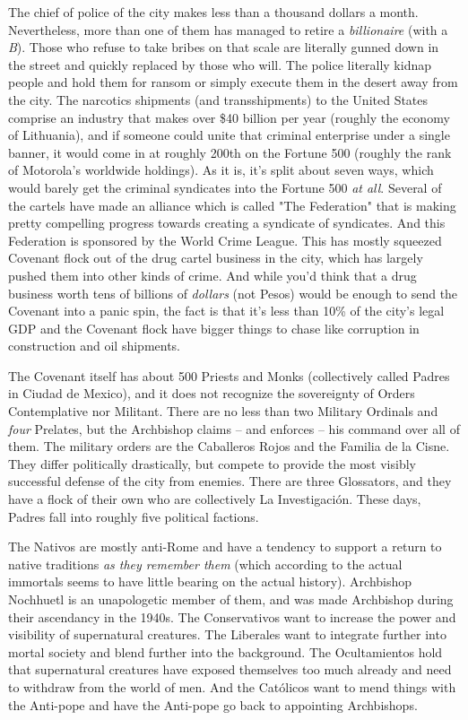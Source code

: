 \hspace{\parindent} The chief of police of the city makes less than a thousand dollars a month. Nevertheless, more than one of them has managed to retire a \textit{billionaire} (with a \textit{B}). Those who refuse to take bribes on that scale are literally gunned down in the street and quickly replaced by those who will. The police literally kidnap people and hold them for ransom or simply execute them in the desert away from the city. The narcotics shipments (and transshipments) to the United States comprise an industry that makes over \$40 billion per year (roughly the economy of Lithuania), and if someone could unite that criminal enterprise under a single banner, it would come in at roughly 200th on the Fortune 500 (roughly the rank of Motorola's worldwide holdings). As it is, it's split about seven ways, which would barely get the criminal syndicates into the Fortune 500 \textit{at all}. Several of the cartels have made an alliance which is called "The Federation" that is making pretty compelling progress towards creating a syndicate of syndicates. And this Federation is sponsored by the World Crime League. This has mostly squeezed Covenant flock out of the drug cartel business in the city, which has largely pushed them into other kinds of crime. And while you'd think that a drug business worth tens of billions of \textit{dollars} (not Pesos) would be enough to send the Covenant into a panic spin, the fact is that it's less than 10\% of the city's legal GDP and the Covenant flock have bigger things to chase like corruption in construction and oil shipments.

The Covenant itself has about 500 Priests and Monks (collectively called Padres in Ciudad de Mexico), and it does not recognize the sovereignty of Orders Contemplative nor Militant. There are no less than two Military Ordinals and \textit{four} Prelates, but the Archbishop claims -- and enforces -- his command over all of them. The military orders are the Caballeros Rojos and the Familia de la Cisne. They differ politically drastically, but compete to provide the most visibly successful defense of the city from enemies. There are three Glossators, and they have a flock of their own who are collectively La Investigaci\'{o}n. These days, Padres fall into roughly five political factions.

The Nativos are mostly anti-Rome and have a tendency to support a return to native traditions \textit{as they remember them} (which according to the actual immortals seems to have little bearing on the actual history). Archbishop Nochhuetl is an unapologetic member of them, and was made Archbishop during their ascendancy in the 1940s. The Conservativos want to increase the power and visibility of supernatural creatures. The Liberales want to integrate further into mortal society and blend further into the background. The Ocultamientos hold that supernatural creatures have exposed themselves too much already and need to withdraw from the world of men. And the Cat\'{o}licos want to mend things with the Anti-pope and have the Anti-pope go back to appointing Archbishops.

